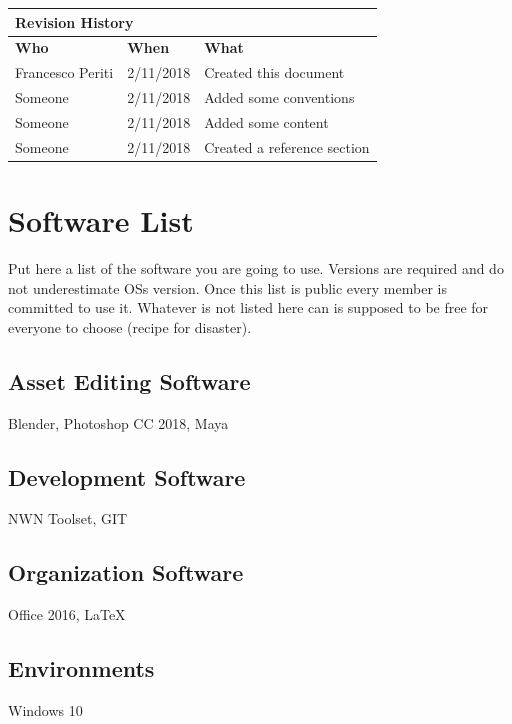\documentclass[12pt]{article}
\begin{document}
\begin{center}
\begin{table}[]
\begin{tabular}{lll}
\hline
\multicolumn{3}{|l|}{\cellcolor{gray}\textbf{Revision History}}\\ \hline
\multicolumn{1}{|l|}{\cellcolor{gray}\textbf{Who}} & \multicolumn{1}{l|}{\cellcolor{gray}\textbf{When}} & \multicolumn{1}{l|}{\cellcolor{gray}\textbf{What}}\\ \hline
\multicolumn{1}{|l|}{Francesco Periti} & \multicolumn{1}{l|}{2/11/2018} & \multicolumn{1}{l|}{Created this document}\\ \hline
\multicolumn{1}{|l|}{Someone} & \multicolumn{1}{l|}{2/11/2018} & \multicolumn{1}{l|}{Added some conventions}\\ \hline
\multicolumn{1}{|l|}{Someone} & \multicolumn{1}{l|}{2/11/2018} & \multicolumn{1}{l|}{Added some content}\\ \hline
\multicolumn{1}{|l|}{Someone} & \multicolumn{1}{l|}{2/11/2018} & \multicolumn{1}{l|}{Created a reference section}\\ \hline
\end{tabular}
\end{table}

\end{center}

\section{Software List}
Put here a list of the software you are going to use. Versions are required and do not underestimate OSs version.
Once this list is public every member is committed to use it.
Whatever is not listed here can is supposed to be free for everyone to choose (recipe for disaster).
\subsection{Asset Editing Software}
Blender, Photoshop CC 2018, Maya
\subsection{Development Software}
NWN Toolset, GIT
\subsection{Organization Software}
Office 2016, LaTeX
\subsection{Environments}
Windows 10
\end{document}
